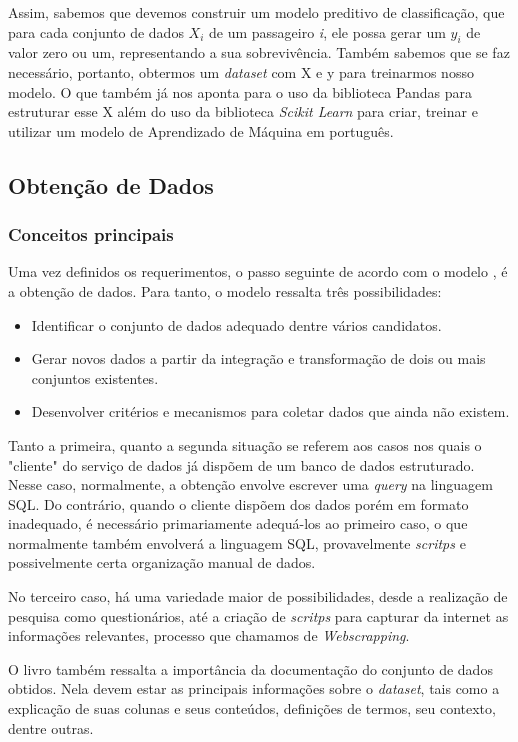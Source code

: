 Assim, sabemos que devemos construir um modelo preditivo de classificação, que para cada conjunto de dados $X_i$ de um passageiro \emph{i}, ele possa gerar um $y_i$ de valor zero ou um, representando a sua sobrevivência. Também sabemos que se faz necessário, portanto, obtermos um \emph{dataset} com X e y para treinarmos nosso modelo. O que também já nos aponta para o uso da biblioteca Pandas para estruturar esse X além do uso da biblioteca \emph{Scikit Learn} para criar, treinar e utilizar um modelo de Aprendizado de Máquina em português.

\subsection{Obtenção de Dados}
\subsubsection{Conceitos principais}
Uma vez definidos os requerimentos, o passo seguinte de acordo com o modelo \cite{BATON}, é a obtenção de dados. Para tanto, o modelo ressalta três possibilidades:
\begin{itemize}
\item Identificar o conjunto de dados adequado dentre vários candidatos. 
\item Gerar novos dados a partir da integração e transformação de dois ou mais conjuntos existentes. 
\item Desenvolver critérios e mecanismos para coletar dados que ainda não existem. 
\end{itemize}
 
Tanto a primeira, quanto a segunda situação se referem aos casos nos quais o "cliente" do serviço de dados já dispõem de um banco de dados estruturado. Nesse caso, normalmente, a obtenção envolve escrever uma \emph{query} na linguagem SQL.  
 Do contrário, quando o cliente dispõem dos dados porém em formato inadequado,  é necessário primariamente adequá-los ao primeiro caso, o que normalmente também envolverá a linguagem SQL, provavelmente \emph{scritps} e possivelmente certa organização manual de dados.  

 No terceiro caso, há uma variedade maior de possibilidades, desde a realização de pesquisa como questionários, até a criação de \emph{scritps} para capturar da internet as informações relevantes, processo que chamamos de \emph{Webscrapping}\cite{mitchell2018web}. 
  
O livro \cite{DATAPYTHON} também ressalta a importância da documentação do conjunto de dados obtidos. Nela devem estar as principais informações sobre o \emph{dataset}, tais como a explicação de suas colunas e seus conteúdos, definições de termos, seu contexto, dentre outras. 


